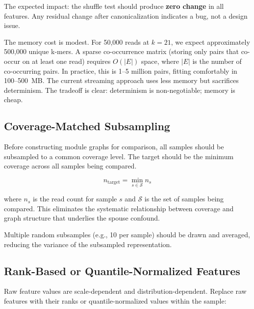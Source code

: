 \documentclass{../yalumba}
\begin{document}

The expected impact: the shuffle test should produce \textbf{zero change}
in all features.  Any residual change after canonicalization indicates
a bug, not a design issue.

The memory cost is modest.  For 50,000 reads at $k = 21$, we expect
approximately 500,000 unique k-mers.  A sparse co-occurrence matrix
(storing only pairs that co-occur on at least one read) requires
$O(|E|)$ space, where $|E|$ is the number of co-occurring pairs.  In
practice, this is 1--5 million pairs, fitting comfortably in 100--500~MB.
The current streaming approach uses less memory but sacrifices
determinism.  The tradeoff is clear: determinism is non-negotiable;
memory is cheap.

\subsection{Coverage-Matched Subsampling}

Before constructing module graphs for comparison, all samples should be
subsampled to a common coverage level.  The target should be the minimum
coverage across all samples being compared.

\begin{equation}
  n_{\text{target}} = \min_{s \in \mathcal{S}} n_s
  \label{eq:coverage-match}
\end{equation}

where $n_s$ is the read count for sample $s$ and $\mathcal{S}$ is the
set of samples being compared.  This eliminates the systematic
relationship between coverage and graph structure that underlies the
spouse confound.

Multiple random subsamples (e.g., 10 per sample) should be drawn and
averaged, reducing the variance of the subsampled representation.

\subsection{Rank-Based or Quantile-Normalized Features}

Raw feature values are scale-dependent and distribution-dependent.
Replace raw features with their ranks or quantile-normalized values
within the sample:
\end{document}
